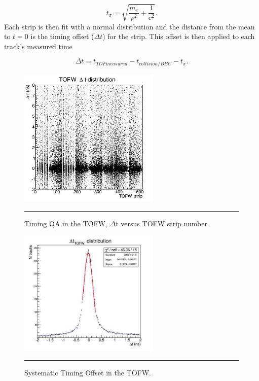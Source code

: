 \begin{equation}
t_{\pi} = \sqrt{\frac{m_{\pi}}{p^2} + \frac{1}{c^2}}.
\end{equation}
Each strip is then fit with a normal distribution and the distance from the mean to $t=0$ is the timing offset ($\Delta t$) for the strip. This offset is then applied to each track's measured time

\begin{equation}
\Delta t = t_{TOF measured} - t_{collision/BBC} - t_{\pi}.
\end{equation}
 
\begin{figure}[h]
  \centering
    \includegraphics[width=0.6\textwidth]{evtQA/ttofwdist.JPG}
    \rule{35em}{0.5pt}
  \caption[Timing QA in the TOFW]{Timing QA in the TOFW, $\Delta$t versus TOFW strip number.}
  \label{fig:tofwdist}
\end{figure}

\begin{figure}[h]
  \centering
    \includegraphics[width=0.6\textwidth]{evtQA/deltattofwdist.jpg}
    \rule{35em}{0.5pt}
  \caption[Systematic Offset in TOFW]{Systematic Timing Offset in the TOFW.}
  \label{fig:tofwsyst}
\end{figure}


